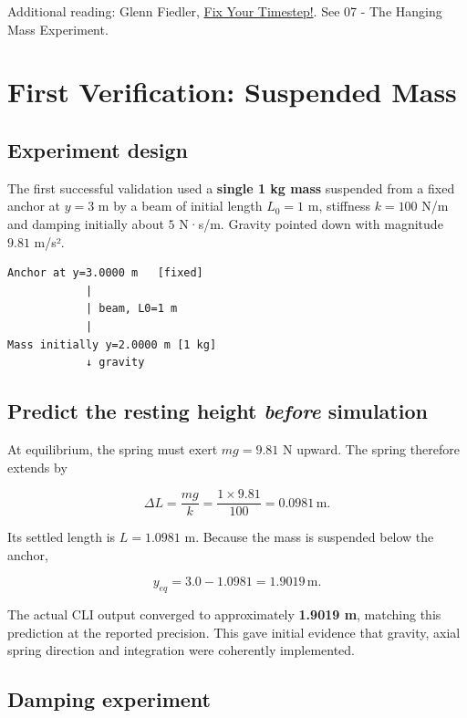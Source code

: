 \documentclass[
  10pt,
  a4paper,
]{article}
\begin{document}
Additional reading: Glenn Fiedler,
\href{https://gafferongames.com/post/fix_your_timestep/}{Fix Your
Timestep!}. See 07 - The Hanging Mass Experiment.

\newpage

\section{First Verification: Suspended
Mass}\label{first-verification-suspended-mass}

\subsection{Experiment design}\label{experiment-design}

The first successful validation used a \textbf{single 1 kg mass}
suspended from a fixed anchor at \(y=3\) m by a beam of initial length
\(L_0=1\) m, stiffness \(k=100\) N/m and damping initially about \(5\)
N·s/m. Gravity pointed down with magnitude \(9.81\) m/s².

\begin{verbatim}
Anchor at y=3.0000 m   [fixed]
            |
            | beam, L0=1 m
            |
Mass initially y=2.0000 m [1 kg]
            ↓ gravity
\end{verbatim}

\subsection{\texorpdfstring{Predict the resting height \emph{before}
simulation}{Predict the resting height before simulation}}\label{predict-the-resting-height-before-simulation}

At equilibrium, the spring must exert \(mg=9.81\) N upward. The spring
therefore extends by

\[\Delta L=\frac{mg}{k}=\frac{1\times9.81}{100}=0.0981\,\mathrm m.\]

Its settled length is \(L=1.0981\) m. Because the mass is suspended
below the anchor,

\[\boxed{y_{eq}=3.0-1.0981=1.9019\,\mathrm m}.\]

The actual CLI output converged to approximately \textbf{1.9019 m},
matching this prediction at the reported precision. This gave initial
evidence that gravity, axial spring direction and integration were
coherently implemented.

\subsection{Damping experiment}\label{damping-experiment}
\end{document}
